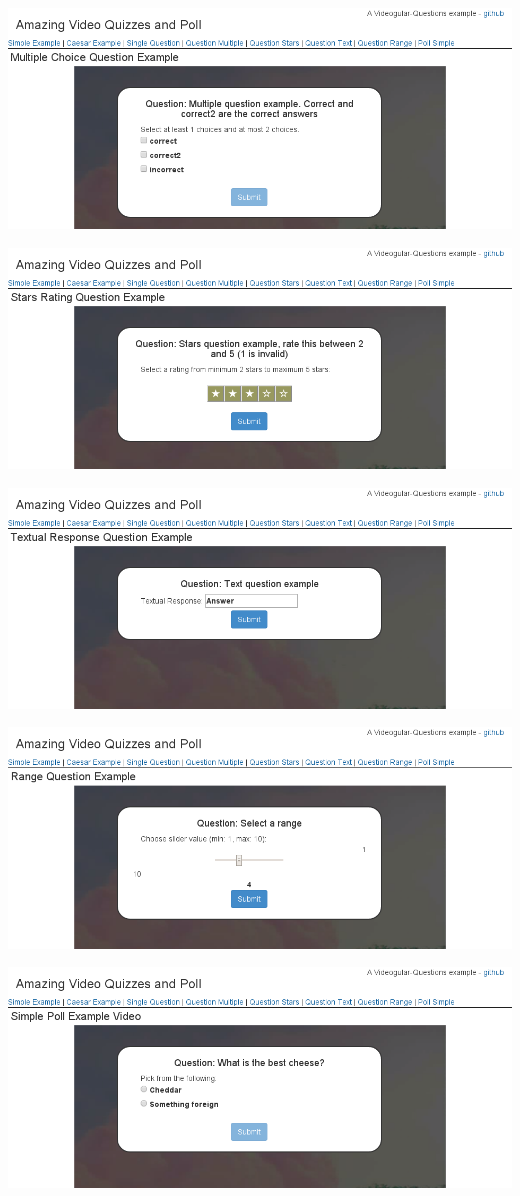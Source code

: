 \includegraphics[width=\textwidth]{screenshots/videogular-questions-example-question-multiple.png}

\includegraphics[width=\textwidth]{screenshots/videogular-questions-example-question-stars.png}

\includegraphics[width=\textwidth]{screenshots/videogular-questions-example-question-text.png}

\includegraphics[width=\textwidth]{screenshots/videogular-questions-example-question-range.png}

\includegraphics[width=\textwidth]{screenshots/videogular-questions-example-poll-simple.png}
